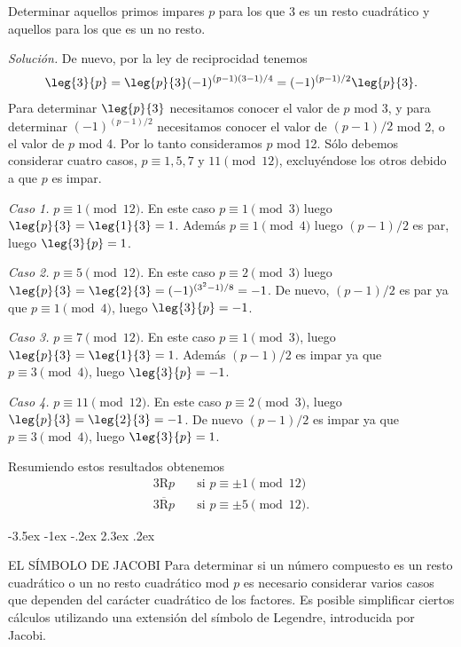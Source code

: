 \documentclass[12pt,a4paper]{book}
\makeatletter
\renewcommand\section{\@startsection{section}{1}{\z@}%
  {-3.5ex \@plus -1ex \@minus -.2ex}%
  {2.3ex \@plus .2ex}%
  {\normalfont\Large\bfseries\raggedright}}
\makeatother
\begin{document}
    \begin{ejemplo}
        Determinar aquellos primos impares $p$ para los que 3 es un resto cuadrático y
        aquellos para los que es un no resto.

        \textit{Solución.} De nuevo, por la ley de reciprocidad tenemos
        \begin{equation*}
            \leg{3}{p}=\leg{p}{3}(-1)^{(p-1)(3-1)/4}=(-1)^{(p-1)/2}\leg{p}{3}.
        \end{equation*}
        Para determinar $\leg{p}{3}$ necesitamos conocer el valor de $p$ mod 3, y para
        determinar $(-1)^{(p-1)/2}$ necesitamos conocer el valor de $(p-1)/2$ mod 2, o el
        valor de $p$ mod 4. Por lo tanto consideramos $p$ mod 12. Sólo debemos considerar
        cuatro casos, $p\equiv1,5,7$ y $11\pmod{12}$, excluyéndose los otros debido a que
        $p$ es impar.

        \textit{Caso 1.} $p\equiv1\pmod{12}$. En este caso $p\equiv1\pmod{3}$ luego
        $\leg{p}{3}=\leg{1}{3}=1$. Además $p\equiv1\pmod{4}$ luego $(p-1)/2$ es par, luego
        $\leg{3}{p}=1$.

        \textit{Caso 2.} $p\equiv5\pmod{12}$. En este caso $p\equiv2\pmod{3}$ luego
        $\leg{p}{3}=\leg{2}{3}=(-1)^{(3^{2}-1)/8}=-1$. De nuevo, $(p-1)/2$ es par ya que
        $p\equiv1\pmod{4}$, luego $\leg{3}{p}=-1$.

        \textit{Caso 3.} $p\equiv7\pmod{12}$. En este caso $p\equiv1\pmod{3}$, luego
        $\leg{p}{3}=\leg{1}{3}=1$. Además $(p-1)/2$ es impar ya que $p\equiv3\pmod{4}$,
        luego $\leg{3}{p}=-1$.

        \textit{Caso 4.} $p\equiv11\pmod{12}$. En este caso $p\equiv2\pmod{3}$, luego
        $\leg{p}{3}=\leg{2}{3}=-1$. De nuevo $(p-1)/2$ es impar ya que $p\equiv3\pmod{4}$,
        luego $\leg{3}{p}=1$.

        Resumiendo estos resultados obtenemos
        \begin{align*}
            3\mathrm{R}p&\quad\text{si }p\equiv\pm1\pmod{12}\\
            3\overline{\mathrm{R}}p&\quad\text{si }p\equiv\pm5\pmod{12}.
        \end{align*}
    \end{ejemplo}

    \section{EL SÍMBOLO DE JACOBI}\label{sim:jac}
    Para determinar si un número compuesto es un resto cuadrático o un no resto cuadrático
    mod $p$ es necesario considerar varios casos que dependen del carácter cuadrático de
    los factores. Es posible simplificar ciertos cálculos utilizando una extensión del
    símbolo de Legendre, introducida por Jacobi.
\end{document}
